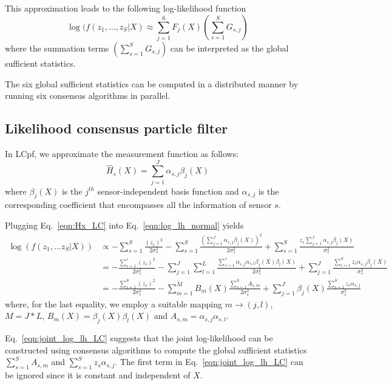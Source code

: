 \documentclass[10pt,letterpaper,final]{article}
\begin{document}
This approximation leads to the following log-likelihood function
\begin{equation}
\log(f(z_1,..., z_S|X) \approx \sum_{j=1}^6 F_j(X) \left(\sum_{s=1}^S G_{s,j}\right)
\label{eqn:llh_css}
\end{equation}
where the summation terms $\left(\sum_{s=1}^S G_{s,j}\right)$ can be interpreted as the global sufficient statistics. 

The six global sufficient statistics can be computed in a distributed manner by running six consensus algorithms in parallel. 

\subsection{Likelihood consensus particle filter}
In LCpf, we approximate the measurement function as follows:
\begin{equation}
\hat{H}_s(X) = \sum_{j=1}^J \alpha_{s,j} \beta_j(X)
\label{eqn:Hx_LC}
\end{equation}
where $\beta_j(X)$ is the $j^{th}$ sensor-independent basis function and $\alpha_{s,j}$ is the corresponding coefficient that encompasses all the information of sensor $s$. 

Plugging Eq.~\eqref{eqn:Hx_LC} into Eq.~\eqref{eqn:log_lh_normal} yields
\begin{align}
\log(f(z_1,...z_S|X)) &\propto -\sum_{s=1}^S \frac{(z_s)^2}{2\sigma_s^2} -\sum_{s=1}^S \frac{\left( \sum_{j=1}^J \alpha_{s,j} \beta_j(X)\right)^2}{2\sigma_s^2} + \sum_{s=1}^S \frac{z_s\sum_{j=1}^J \alpha_{s,j} \beta_j(X)}{\sigma_s^2} \nonumber \\
&= -\frac{\sum_{s=1}^s(z_s)^2}{2\sigma_s^2} - \sum_{j=1}^J\sum_{l=1}^L\frac{\sum_{s=1}^s \alpha_{s,j}\alpha_{s,l} \beta_j(X)\beta_l(X)}{2\sigma_s^2}+ \sum_{j=1}^J\frac{\sum_{s=1}^S z_s \alpha_{s,j} \beta_j(X)}{\sigma_s^2} \nonumber \\
&= -\frac{\sum_{s=1}^S(z_s)^2}{2\sigma_s^2} - \sum_{m=1}^MB_{m}(X)\frac{\sum_{s=1}^S A_{s,m} }{2\sigma_s^2}+ \sum_{j=1}^J\beta_j(X)\frac{\sum_{s=1}^S z_s \alpha_{s,j} }{\sigma_s^2} 
\label{eqn:joint_log_lh_LC}
\end{align}
where, for the last equality, we employ a suitable mapping $m\rightarrow (j,l)$, $M=J*L$, $B_m(X)=\beta_j(X)\beta_l(X)$ and $A_{s,m} = \alpha_{s,j}\alpha_{s,l}$. 

Eq.~\eqref{eqn:joint_log_lh_LC} suggests that the joint log-likelihood can be constructed using consensus algorithms to compute the global sufficient statistics $\sum_{s=1}^S A_{s,m}$ and $\sum_{s=1}^S z_s\alpha_{s,j}$. The first term in Eq.~\eqref{eqn:joint_log_lh_LC} can be ignored since it is constant and independent of $X$. 
\end{document}
